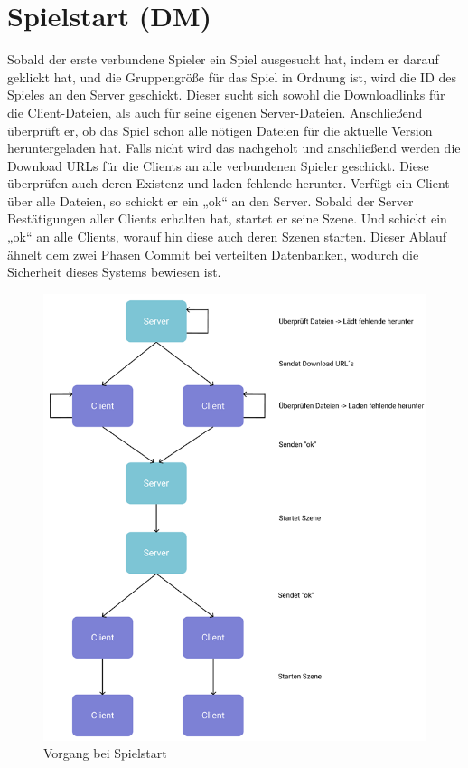 \section{Spielstart (DM)} \label{sec:spielstart}
Sobald der erste verbundene Spieler ein Spiel ausgesucht hat, indem er darauf geklickt hat, und die Gruppengröße für das Spiel in Ordnung ist, wird die ID des Spieles an den Server geschickt.
Dieser sucht sich sowohl die Downloadlinks für die Client-Dateien, als auch für seine eigenen Server-Dateien. Anschließend überprüft er, ob das Spiel schon alle nötigen Dateien für die aktuelle Version heruntergeladen hat. Falls nicht wird das nachgeholt und anschließend werden die Download URLs für die Clients an alle verbundenen Spieler geschickt. Diese überprüfen auch deren Existenz und laden fehlende herunter. Verfügt ein Client über alle Dateien, so schickt er ein „ok“ an den Server. Sobald der Server Bestätigungen aller Clients erhalten hat, startet er seine Szene. Und schickt ein „ok“ an alle Clients, worauf hin diese auch deren Szenen starten. Dieser Ablauf ähnelt dem zwei Phasen Commit bei verteilten Datenbanken, wodurch die Sicherheit dieses Systems bewiesen ist.
\begin{figure}
    \includegraphics{images/spielstart.png}
    \caption{Vorgang bei Spielstart}
    \label{img:spielstart}
\end{figure}
